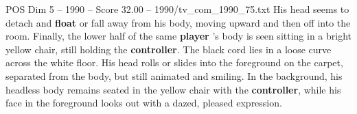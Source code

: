 \begin{textsample}{POS Dim 5 – 1990 – Score 32.00 – 1990/tv\_com\_1990\_75.txt}
His head seems to detach and \textbf{float} or fall away from his body, moving upward and then off into the room.
Finally, the lower half of the same \textbf{player} ’s body is seen sitting in a bright yellow chair, still holding the \textbf{controller}.
The black cord lies in a loose curve across the white floor.
His head rolls or slides into the foreground on the carpet, separated from the body, but still animated and smiling.
In the background, his headless body remains seated in the yellow chair with the \textbf{controller}, while his face in the foreground looks out with a dazed, pleased expression.

\end{textsample}

